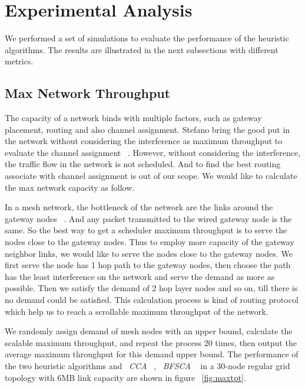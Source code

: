 \section{Experimental Analysis}
\label{sec:experimentdesign}

We performed a set of simulations to evaluate the performance of the heuristic algorithms. The results are illustrated in the next subsections with different metrics.

\subsection{Max Network Throughput} 
The capacity of a network binds with multiple factors, such as gateway placement, routing and also channel assignment. 
Stefano bring the good put in the network without considering the interference as maximum throughput to evaluate the channel assignment ~\cite{avallone2008channel}. However, without considering the interference, the traffic flow in the network is not scheduled.
And to find the best routing associate with channel assignment is out of our scope. 
We would like to calculate the max network capacity as follow.

In a mesh network, the bottleneck of the network are the links around the gateway nodes ~\cite{robinson2010deploying}. 
And any packet transmitted to the wired gateway node is the same. So the best way to get a scheduler maximum throughput is to serve the nodes close to the gateway nodes.
Thus to employ more capacity of the gateway neighbor links, we would like to serve the nodes close to the gateway nodes.
We first serve the node has 1 hop path to the gateway nodes, then choose the path has the least interference on the network and serve the demand as more as possible. Then we satisfy the demand of 2 hop layer nodes and so on, till there is no demand could be satisfied.
This calculation process is kind of routing protocol which help us to reach a scrollable maximum throughput of the network.

We randomly assign demand of mesh nodes with an upper bound, calculate the scalable maximum throughput, and repeat the process 20 times, then output the average maximum throughput for this demand upper bound.
The performance of the two heuristic algorithms and ~\emph{CCA} ~\cite{draves2004routing}, ~\emph{BFSCA}  ~\cite{ramachandran2006interference} in a 30-node regular grid topology with 6MB link capacity
 are shown in figure ~\ref{fig:maxtpt}.

